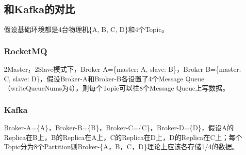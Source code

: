 \subsection{和Kafka的对比}
假设基础环境都是4台物理机\{A, B, C, D\}和4个Topic。

\subsubsection{RocketMQ}
2Master，2Slave模式下，Broker-A=\{master: A, slave: B\}，Broker-B=\{master: C, slave: D\}，假设Broker-A和Broker-B各设置了4个Message Queue（writeQueueNums为4），则每个Topic可以往8个Message Queue上写数据。

\subsubsection{Kafka}
Broker-A=\{A\}，Broker-B=\{B\}，Broker-C=\{C\}，Broker-D=\{D\}，假设A的Replica在B上，B的Replica在A上，C的Replica在D上，D的Replica在C上；每个Topic分为8个Partition则Broker-\{A，B，C，D\}理论上应该各存储1/4的数据。
